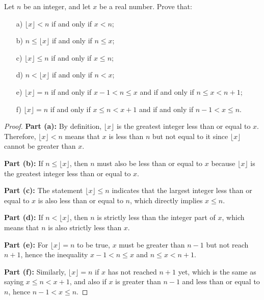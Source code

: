 \begin{exercise}
    Let \( n \) be an integer, and let \( x \) be a real number. Prove that:
\begin{enumerate}
    \item[a)] \( \lfloor x \rfloor < n \) if and only if \( x < n \);
    \item[b)] \( n \leq \lfloor x \rfloor \) if and only if \( n \leq x \);
    \item[c)] \( \lfloor x \rfloor \leq n \) if and only if \( x \leq n \);
    \item[d)] \( n < \lfloor x \rfloor \) if and only if \( n < x \);
    \item[e)] \( \lfloor x \rfloor = n \) if and only if \( x - 1 < n \leq x \) and if and only if \( n \leq x < n + 1 \);
    \item[f)] \( \lfloor x \rfloor = n \) if and only if \( x \leq n < x + 1 \) and if and only if \( n - 1 < x \leq n \).
\end{enumerate}
\end{exercise}
\begin{proof}
    \textbf{Part (a):} By definition, \( \lfloor x \rfloor \) is the greatest integer less than or equal to \( x \). Therefore, \( \lfloor x \rfloor < n \) means that \( x \) is less than \( n \) but not equal to it since \( \lfloor x \rfloor \) cannot be greater than \( x \).
    
    \textbf{Part (b):} If \( n \leq \lfloor x \rfloor \), then \( n \) must also be less than or equal to \( x \) because \( \lfloor x \rfloor \) is the greatest integer less than or equal to \( x \).
    
    \textbf{Part (c):} The statement \( \lfloor x \rfloor \leq n \) indicates that the largest integer less than or equal to \( x \) is also less than or equal to \( n \), which directly implies \( x \leq n \).
    
    \textbf{Part (d):} If \( n < \lfloor x \rfloor \), then \( n \) is strictly less than the integer part of \( x \), which means that \( n \) is also strictly less than \( x \).
    
    \textbf{Part (e):} For \( \lfloor x \rfloor = n \) to be true, \( x \) must be greater than \( n - 1 \) but not reach \( n + 1 \), hence the inequality \( x - 1 < n \leq x \) and \( n \leq x < n + 1 \).
    
    \textbf{Part (f):} Similarly, \( \lfloor x \rfloor = n \) if \( x \) has not reached \( n + 1 \) yet, which is the same as saying \( x \leq n < x + 1 \), and also if \( x \) is greater than \( n - 1 \) and less than or equal to \( n \), hence \( n - 1 < x \leq n \).
    \end{proof}

